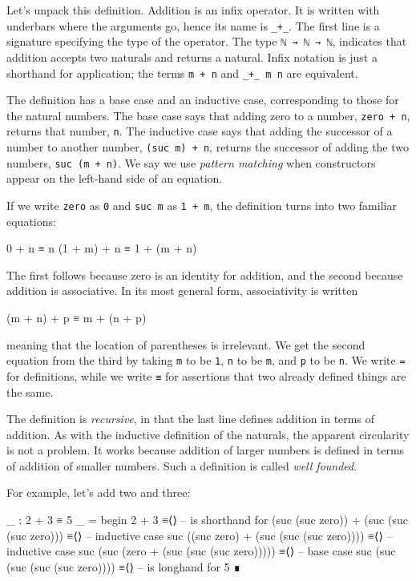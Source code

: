 Let's unpack this definition. Addition is an infix operator. It is
written with underbars where the arguments go, hence its name is
\texttt{\_+\_}. The first line is a signature specifying the type of the
operator. The type \texttt{ℕ\ →\ ℕ\ →\ ℕ}, indicates that addition
accepts two naturals and returns a natural. Infix notation is just a
shorthand for application; the terms \texttt{m\ +\ n} and
\texttt{\_+\_\ m\ n} are equivalent.

The definition has a base case and an inductive case, corresponding to
those for the natural numbers. The base case says that adding zero to a
number, \texttt{zero\ +\ n}, returns that number, \texttt{n}. The
inductive case says that adding the successor of a number to another
number, \texttt{(suc\ m)\ +\ n}, returns the successor of adding the two
numbers, \texttt{suc\ (m\ +\ n)}. We say we use \emph{pattern matching}
when constructors appear on the left-hand side of an equation.

If we write \texttt{zero} as \texttt{0} and \texttt{suc\ m} as
\texttt{1\ +\ m}, the definition turns into two familiar equations:

\begin{myDisplay}
 0       + n  ≡  n
 (1 + m) + n  ≡  1 + (m + n)
\end{myDisplay}

The first follows because zero is an identity for addition, and the
second because addition is associative. In its most general form,
associativity is written

\begin{myDisplay}
 (m + n) + p  ≡  m + (n + p)
\end{myDisplay}

meaning that the location of parentheses is irrelevant. We get the
second equation from the third by taking \texttt{m} to be \texttt{1},
\texttt{n} to be \texttt{m}, and \texttt{p} to be \texttt{n}. We write
\texttt{=} for definitions, while we write \texttt{≡} for assertions
that two already defined things are the same.

The definition is \emph{recursive}, in that the last line defines
addition in terms of addition. As with the inductive definition of the
naturals, the apparent circularity is not a problem. It works because
addition of larger numbers is defined in terms of addition of smaller
numbers. Such a definition is called \emph{well founded}.

For example, let's add two and three:

\begin{fence}
\begin{code}
_ : 2 + 3 ≡ 5
_ =
  begin
    2 + 3
  ≡⟨⟩    -- is shorthand for
    (suc (suc zero)) + (suc (suc (suc zero)))
  ≡⟨⟩    -- inductive case
    suc ((suc zero) + (suc (suc (suc zero))))
  ≡⟨⟩    -- inductive case
    suc (suc (zero + (suc (suc (suc zero)))))
  ≡⟨⟩    -- base case
    suc (suc (suc (suc (suc zero))))
  ≡⟨⟩    -- is longhand for
    5
  ∎
\end{code}
\end{fence}

